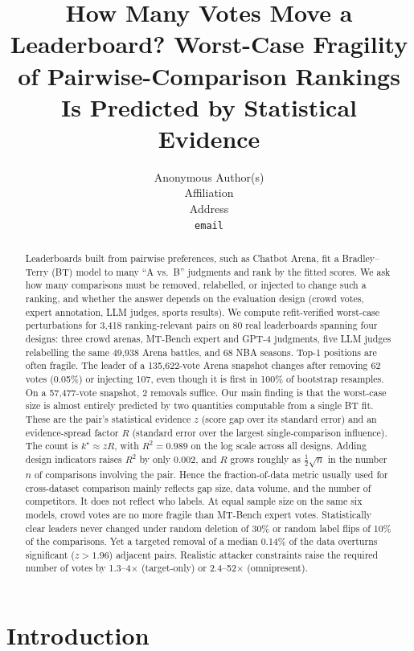 \documentclass{article}
\title{How Many Votes Move a Leaderboard? Worst-Case Fragility of Pairwise-Comparison Rankings Is Predicted by Statistical Evidence}
\author{%
  Anonymous Author(s) \\
  Affiliation \\
  Address \\
  \texttt{email} \\
}
\newcommand{\kstar}{k^\star}
\begin{document}
\maketitle

\begin{abstract}
Leaderboards built from pairwise preferences, such as Chatbot Arena, fit a Bradley--Terry (BT) model to many ``A vs.\ B'' judgments and rank by the fitted scores. We ask how many comparisons must be removed, relabelled, or injected to change such a ranking, and whether the answer depends on the evaluation design (crowd votes, expert annotation, LLM judges, sports results). We compute refit-verified worst-case perturbations for 3,418 ranking-relevant pairs on 80 real leaderboards spanning four designs: three crowd arenas, MT-Bench expert and GPT-4 judgments, five LLM judges relabelling the same 49,938 Arena battles, and 68 NBA seasons. Top-1 positions are often fragile. The leader of a 135,622-vote Arena snapshot changes after removing 62 votes (0.05\%) or injecting 107, even though it is first in 100\% of bootstrap resamples. On a 57,477-vote snapshot, 2 removals suffice. Our main finding is that the worst-case size is almost entirely predicted by two quantities computable from a single BT fit. These are the pair's statistical evidence $z$ (score gap over its standard error) and an evidence-spread factor $R$ (standard error over the largest single-comparison influence). The count is $\kstar \approx zR$, with $R^2=0.989$ on the log scale across all designs. Adding design indicators raises $R^2$ by only 0.002, and $R$ grows roughly as $\tfrac12\sqrt{n}$ in the number $n$ of comparisons involving the pair. Hence the fraction-of-data metric usually used for cross-dataset comparison mainly reflects gap size, data volume, and the number of competitors. It does not reflect who labels. At equal sample size on the same six models, crowd votes are no more fragile than MT-Bench expert votes. Statistically clear leaders never changed under random deletion of 30\% or random label flips of 10\% of the comparisons. Yet a targeted removal of a median 0.14\% of the data overturns significant ($z>1.96$) adjacent pairs. Realistic attacker constraints raise the required number of votes by 1.3--4$\times$ (target-only) or 2.4--52$\times$ (omnipresent).
\end{abstract}

\section{Introduction}
\end{document}
